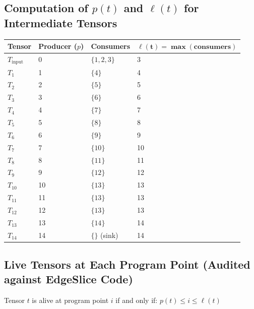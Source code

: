 \documentclass[11pt,a4paper]{article}
\begin{document}
\newpage

\subsection{Computation of $p(t)$ and $\ell(t)$ for Intermediate Tensors}

\begin{table}[H]
\centering
\begin{tabular}{llll}
\toprule
\textbf{Tensor} & \textbf{Producer ($p$)} & \textbf{Consumers} & $\boldsymbol{\ell(t) = \max(\text{consumers})}$ \\
\midrule
$T_{\text{input}}$ & 0  & $\{1, 2, 3\}$ & 3 \\
$T_1$              & 1  & $\{4\}$       & 4 \\
$T_2$              & 2  & $\{5\}$       & 5 \\
$T_3$              & 3  & $\{6\}$       & 6 \\
$T_4$              & 4  & $\{7\}$       & 7 \\
$T_5$              & 5  & $\{8\}$       & 8 \\
$T_6$              & 6  & $\{9\}$       & 9 \\
$T_7$              & 7  & $\{10\}$      & 10 \\
$T_8$              & 8  & $\{11\}$      & 11 \\
$T_9$              & 9  & $\{12\}$      & 12 \\
$T_{10}$             & 10 & $\{13\}$      & 13 \\
$T_{11}$             & 11 & $\{13\}$      & 13 \\
$T_{12}$             & 12 & $\{13\}$      & 13 \\
$T_{13}$             & 13 & $\{14\}$      & 14 \\
$T_{14}$             & 14 & $\{\}$ (sink) & 14 \\
\bottomrule
\end{tabular}
\end{table}

\subsection{Live Tensors at Each Program Point (Audited against EdgeSlice Code)}

Tensor $t$ is alive at program point $i$ if and only if: $p(t) \le i \le \ell(t)$
\end{document}
